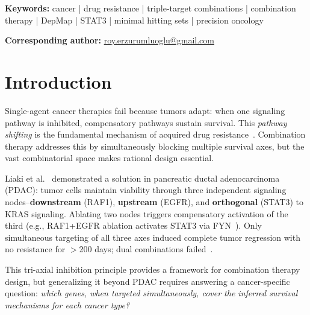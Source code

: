 \documentclass[times, twoside, watermark]{zHenriquesLab-StyleBioRxiv}
\newenvironment{keywords}{\noindent\textbf{Keywords:} }{\par}%
\begin{document}
\begin{keywords}
cancer | drug resistance | triple-target combinations | combination therapy | DepMap | STAT3 | minimal hitting sets | precision oncology
\end{keywords}

\noindent\textbf{Corresponding author:} \href{mailto:roy.erzurumluoglu@gmail.com}{roy.erzurumluoglu@gmail.com}

\newpage
\twocolumn
\raggedbottom
\sloppy

\renewcommand{\dbltopfraction}{0.9}      %
\renewcommand{\textfraction}{0.07}       %
\renewcommand{\dblfloatpagefraction}{0.7}%
\setcounter{dbltopnumber}{2}             %
\setcounter{topnumber}{3}
\setcounter{totalnumber}{5}


\section*{Introduction}

Single-agent cancer therapies fail because tumors adapt: when one signaling pathway is inhibited, compensatory pathways sustain survival. This \emph{pathway shifting} is the fundamental mechanism of acquired drug resistance~\cite{Bergholz2021,Xin2024}. Combination therapy addresses this by simultaneously blocking multiple survival axes, but the vast combinatorial space makes rational design essential.

Liaki et al.~\cite{Liaki2025} demonstrated a solution in pancreatic ductal adenocarcinoma (PDAC): tumor cells maintain viability through three independent signaling nodes--\textbf{downstream} (RAF1), \textbf{upstream} (EGFR), and \textbf{orthogonal} (STAT3) to KRAS signaling. Ablating two nodes triggers compensatory activation of the third (e.g., RAF1+EGFR ablation activates STAT3 via FYN~\cite{Chougule2016,Zhang2020FYN}). Only simultaneous targeting of all three axes induced complete tumor regression with no resistance for $>$200 days; dual combinations failed~\cite{Liaki2025}.

This tri-axial inhibition principle provides a framework for combination therapy design, but generalizing it beyond PDAC requires answering a cancer-specific question: \emph{which genes, when targeted simultaneously, cover the inferred survival mechanisms for each cancer type?}
\end{document}
